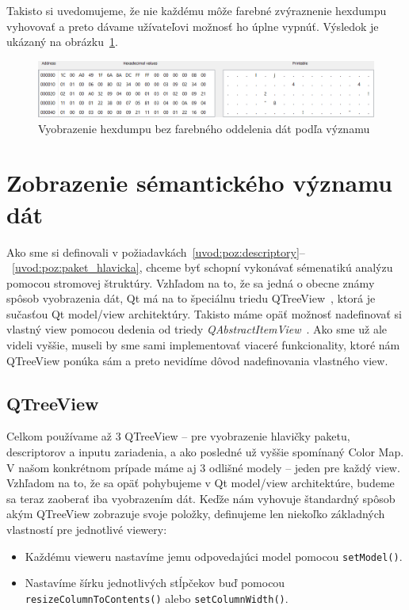 Takisto si uvedomujeme, že nie každému môže farebné zvýraznenie hexdumpu vyhovovať a preto dávame užívateľovi možnosť ho úplne vypnúť. Výsledok je ukázaný na obrázku~\ref{obr:kap3:hexdump_clear}.

\begin{figure}[!htb]
	\centering
	\includegraphics[width=\textwidth]{img/kap03_hexdump_clear}
	\caption{Vyobrazenie hexdumpu bez farebného oddelenia dát podľa významu}
	\label{obr:kap3:hexdump_clear}
\end{figure}

\section{Zobrazenie sémantického významu dát}
Ako sme si definovali v požiadavkách~\ref{uvod:poz:descriptory}--~\ref{uvod:poz:paket_hlavicka}, chceme byť schopní vykonávať sémenatikú analýzu pomocou stromovej štruktúry. Vzhľadom na to, že sa jedná o obecne známy spôsob vyobrazenia dát, Qt má na to špeciálnu triedu QTreeView~\cite{qtreeview}, ktorá je sučasťou Qt model/view architektúry. Takisto máme opäť možnosť nadefinovať si vlastný view pomocou dedenia od triedy \textit{QAbstractItemView}~\cite{qabstractitemview}. Ako sme už ale videli vyššie, museli by sme sami implementovať viaceré funkcionality, ktoré nám QTreeView ponúka sám a preto nevidíme dôvod nadefinovania vlastného view.

\subsection*{QTreeView}
Celkom používame až 3 QTreeView -- pre vyobrazenie hlavičky paketu, descriptorov a inputu zariadenia, a ako posledné už vyššie spomínaný Color Map. V našom konkrétnom prípade máme aj 3 odlišné modely -- jeden pre každý view. Vzhľadom na to, že sa opäť pohybujeme v Qt model/view architektúre, budeme sa teraz zaoberať iba vyobrazením dát. Keďže nám vyhovuje štandardný spôsob akým QTreeView zobrazuje svoje položky, definujeme len niekoľko základných vlastností pre jednotlivé viewery:
\begin{itemize}
\item Každému vieweru nastavíme jemu odpovedajúci model pomocou \newline\texttt{setModel()}.
\item Nastavíme šírku jednotlivých stĺpčekov buď pomocou \newline\texttt{resizeColumnToContents()} alebo \texttt{setColumnWidth()}.
\end{itemize}

